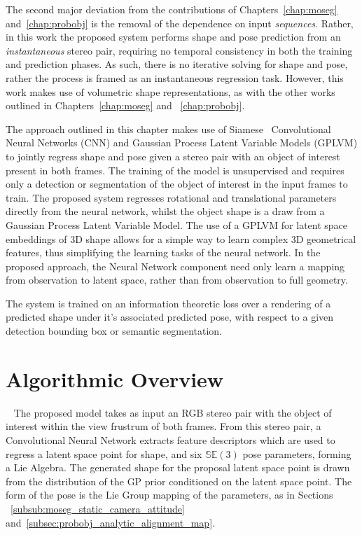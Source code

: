 The second major deviation from the contributions of Chapters~\ref{chap:moseg} and~\ref{chap:probobj} 
is the removal of the dependence on input \textit{sequences}. Rather, in this work 
the proposed system performs shape and pose prediction from an \textit{instantaneous}
stereo pair, requiring no temporal consistency in both the training and prediction 
phases. As such, there is no iterative solving for shape and pose, rather the process 
is framed as an instantaneous regression task. However, this work makes use of volumetric
shape representations, as with the other works outlined in Chapters~\ref{chap:moseg} and
~\ref{chap:probobj}.

The approach outlined in this chapter makes use of Siamese~\cite{SIAMESE} 
Convolutional Neural Networks (CNN) and Gaussian Process Latent Variable Models (GPLVM) to jointly regress 
shape and pose given a stereo pair with an object of interest present in both frames. The training of the 
model is unsupervised and requires only a detection or segmentation of the object of interest in the input 
frames to train. The proposed system regresses rotational and translational parameters directly 
from the neural network, whilst the object shape is a draw from a Gaussian Process 
Latent Variable Model. The use of a GPLVM for latent space embeddings of 3D shape 
allows for a simple way to learn complex 3D geometrical features, thus simplifying 
the learning tasks of the neural network. In the proposed approach, the Neural Network 
component need only learn a mapping from observation to latent space, rather than from observation 
to full geometry.

The system is trained on an information theoretic loss over a rendering of a predicted 
shape under it's associated predicted pose, with respect to a given detection bounding box 
or semantic segmentation. 

\section{Algorithmic Overview}
~\label{sec:spp_algorithm}
The proposed model takes as input an RGB stereo pair with the object of interest within the 
view frustrum of both frames. From this stereo pair, a Convolutional Neural Network extracts 
feature descriptors which are used to regress a latent space point for shape, and six 
\( \mathbb{SE}(3) \) pose parameters, forming a Lie Algebra. The generated shape for the proposal 
latent space point is drawn from the distribution of the GP prior conditioned on the latent space 
point. The form of the pose is the Lie Group mapping of the parameters, as in Sections
~\ref{subsub:moseg_static_camera_attitude} and~\ref{subsec:probobj_analytic_alignment_map}. 

